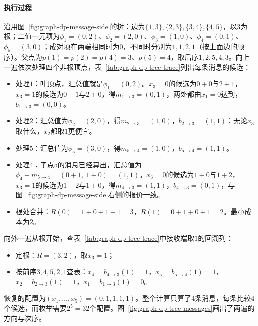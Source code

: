 \paragraph{执行过程}
沿用图~\ref{fig:graph-dp-message-side}的树：边为$\{1,3\},\allowbreak\{2,3\},\allowbreak\{3,4\},\allowbreak\{4,5\}$，以$3$为根；二值一元项为$\phi_1=(0,2)$、$\phi_2=(2,0)$、$\phi_3=(1,0)$、$\phi_4=(0,1)$、$\phi_5=(3,0)$；成对项在两端相同时为$0$，不同时分别为$1,1,2,1$（按上面边的顺序）。父点为$p(1)=p(2)=p(4)=3$、$p(5)=4$，取后序$1,2,5,4,3$。向上一遍依次处理四个非根顶点，表~\ref{tab:graph-dp-tree-trace}列出每条消息的候选：
\begin{itemize}
  \item 处理$1$：叶顶点，汇总值就是$\phi_1=(0,2)$。$x_3=0$的候选为$0+0$与$2+1$，$x_3=1$的候选为$0+1$与$2+0$，得$m_{1\to3}=(0,1)$，两处都由$x_1=0$达到，$b_{1\to3}=(0,0)$。
  \item 处理$2$：汇总值为$\phi_2=(2,0)$，得$m_{2\to3}=(1,0)$，$b_{2\to3}=(1,1)$：无论$x_3$取什么，$x_2$都取$1$更便宜。
  \item 处理$5$：汇总值为$\phi_5=(3,0)$，得$m_{5\to4}=(1,0)$，$b_{5\to4}=(1,1)$。
  \item 处理$4$：子点$5$的消息已经算出，汇总值为$\phi_4+m_{5\to4}=(0+1,\ 1+0)=(1,1)$。$x_3=0$的候选为$1+0$与$1+2$，$x_3=1$的候选为$1+2$与$1+0$，得$m_{4\to3}=(1,1)$，$b_{4\to3}=(0,1)$，与图~\ref{fig:graph-dp-message-side}右侧的报价一致。
  \item 根处合并：$R(0)=1+0+1+1=3$，$R(1)=0+1+0+1=2$。最小成本为$2$。
\end{itemize}
向外一遍从根开始，查表~\ref{tab:graph-dp-tree-trace}中接收端取$1$的回溯列：
\begin{itemize}
  \item 定根：$R=(3,2)$，取$x_3=1$；
  \item 按前序$3,4,5,2,1$查表：$x_4=b_{4\to3}(1)=1$，$x_5=b_{5\to4}(1)=1$，$x_2=b_{2\to3}(1)=1$，$x_1=b_{1\to3}(1)=0$。
\end{itemize}
恢复的配置为$(x_1,\ldots,x_5)=(0,1,1,1,1)$。整个计算只算了$4$条消息，每条比较$4$个候选，而枚举需要$2^5=32$个配置。图~\ref{fig:graph-dp-tree-messages}画出了两遍的方向与次序。

